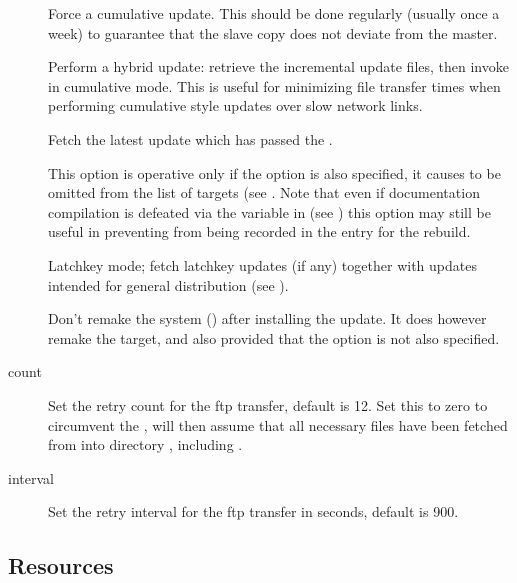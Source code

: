 \begin{description}
\item[]
   Force a cumulative update.  This should be done regularly (usually once a
   week) to guarantee that the slave copy does not deviate from the master.

\item[]
   Perform a hybrid update: retrieve the incremental update files, then
   invoke  in cumulative mode.  This is useful for
   minimizing file transfer times when performing cumulative style
   updates over slow network links.

\item[]
   Fetch the latest update which has passed the .

\item[]
   This option is operative only if the  option is also specified, it
   causes  to be omitted from the list of targets (see
   .  Note that even if documentation compilation is
   defeated via the  variable in  (see
   ) this option may still be useful in preventing
    from being recorded in the  entry for the
   rebuild.

\item[]
   Latchkey mode; fetch latchkey updates (if any) together with updates
   intended for general distribution (see ).

\item[]
   Don't remake the system () after installing the update.  It
   does however remake the  target, and also 
   provided that the  option is not also specified.

\item[ count]
   Set the retry count for the ftp transfer, default is 12.  Set this to zero
   to circumvent the ,  will then assume that all
   necessary files have been fetched from  into directory
   , including .

\item[ interval]
   Set the retry interval for the ftp transfer in seconds, default is 900.
\end{description}

\subsection*{Resources}

